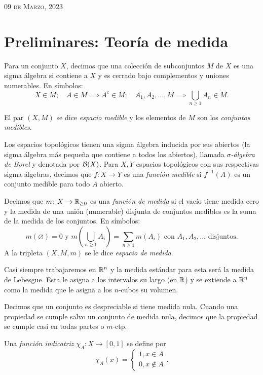 \documentclass[../edp.tex]{subfiles}
\begin{document}
{\scshape \hfill 09 de Marzo, 2023}

\section{Preliminares: Teoría de medida}

Para un conjunto \(X\), decimos que una colección de subconjuntos \(M\) de 
\(X\) es una sigma álgebra si contiene a \(X\) y es cerrado bajo complementos
y uniones numerables. En símbolos:
\begin{displaymath}
	X\in M
	;\quad
	A\in M \implies A^c \in M
	;\quad
	A_1, A_2, \dots, M \implies \bigcup_{n\ge 1} A_n \in M.
\end{displaymath}

El par \((X, M)\) se dice \textit{espacio medible} y 
los elementos de \(M\) son los \textit{conjuntos medibles}.

Los espacios topológicos tienen una sigma álgebra inducida por sus abiertos (la
sigma álgebra más pequeña que contiene a todos los abiertos),
llamada \textit{\(\sigma\)-álgebra de Borel} y denotada por \(\mathcal{B}(X)\).
Para \(X,Y\) espacios topológicos con sus respectivas sigma álgebras, 
decimos que \(f\colon X \to Y\)
es una \textit{función medible} si \(f^{-1}(A)\) es un conjunto medible
para todo \(A\) abierto.

Decimos que \(m\colon X \to \mathbb{R}_{\ge 0}\) es una
\textit{función de medida} si el vacío tiene medida cero y la medida de una 
unión (numerable) disjunta de conjuntos medibles es la suma de la medida de 
los conjuntos. En símbolos:
\begin{displaymath}
	m(\varnothing) = 0
	\text{ y }
	m\left(\bigcup_{n\ge 1} A_i\right) = \sum_{n\ge 1} m(A_i)
	\text{ con } A_1, A_2, \dots \text{ disjuntos.}
\end{displaymath}
A la tripleta \((X,M,m)\) se le dice \textit{espacio de medida}.

Casi siempre trabajaremos en \(\mathbb{R}^n\) y la medida estándar para esta será la
medida de Lebesgue. Esta le asigna a los intervalos su largo (en \(\mathbb{R}\)) y se
extiende a \(\mathbb{R}^n\) como la medida que le asigna a los \(n\)-cubos su volumen.

Decimos que un conjunto es despreciable si tiene medida nula. Cuando una
propiedad se cumple salvo un conjunto de medida nula, decimos que la propiedad
se cumple casi en todas partes o \(m\)-ctp.

Una \textit{función indicatriz} \(\chi_{A}\colon X \to [0, 1]\) se define por 
\begin{displaymath}
	\chi_{A}(x) = 
	\begin{cases}
		1, x\in A\\
		0, x\not\in A
	\end{cases}.
\end{displaymath}
\end{document}
